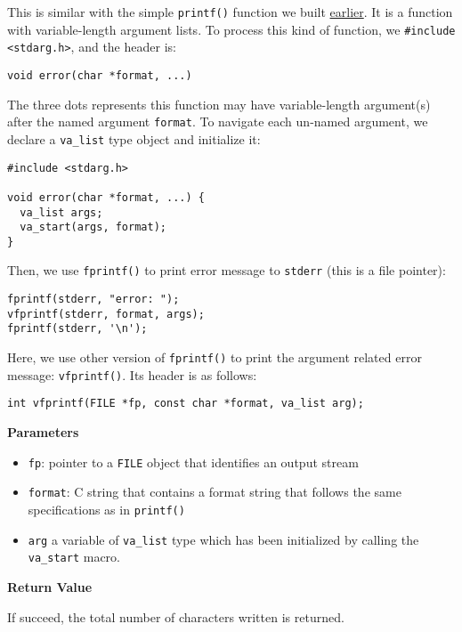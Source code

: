 \documentclass[11pt]{article}
\begin{document}
This is similar with the simple \texttt{printf()} function we built \hyperref[orgce675b0]{earlier}. It is a function with variable-length argument lists. To process this kind of function, we \texttt{\#include <stdarg.h>}, and the header is:
\begin{verbatim}
void error(char *format, ...)
\end{verbatim}
The three dots represents this function may have variable-length argument(s) after the named argument \texttt{format}. To navigate each un-named argument, we declare a \texttt{va\_list} type object and initialize it:
\begin{verbatim}
#include <stdarg.h>

void error(char *format, ...) {
  va_list args;
  va_start(args, format);
}
\end{verbatim}

Then, we use \texttt{fprintf()} to print error message to \texttt{stderr} (this is a file pointer):
\begin{verbatim}
fprintf(stderr, "error: ");
vfprintf(stderr, format, args);
fprintf(stderr, '\n');
\end{verbatim}

Here, we use other version of \texttt{fprintf()} to print the argument related error message: \texttt{vfprintf()}. Its header is as follows:
\begin{verbatim}
int vfprintf(FILE *fp, const char *format, va_list arg);
\end{verbatim}

\textbf{Parameters}

\begin{itemize}
\item \texttt{fp}: pointer to a \texttt{FILE} object that identifies an output stream
\item \texttt{format}: C string that contains a format string that follows the same specifications as in \texttt{printf()}
\item \texttt{arg} a variable of \texttt{va\_list} type which has been initialized by calling the \texttt{va\_start} macro.
\end{itemize}

\textbf{Return Value}

If succeed, the total number of characters written is returned.
\end{document}
